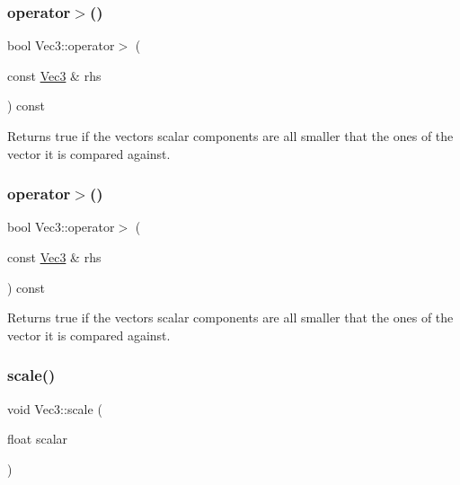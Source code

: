 \subsubsection{\texorpdfstring{operator$>$()}{operator>()}\hspace{0.1cm}{\footnotesize\ttfamily [1/2]}}
{\footnotesize\ttfamily bool Vec3\+::operator$>$ (\begin{DoxyParamCaption}\item[{const \hyperlink{classVec3}{Vec3} \&}]{rhs }\end{DoxyParamCaption}) const\hspace{0.3cm}{\ttfamily [inline]}}

Returns true if the vector\textquotesingle{}s scalar components are all smaller that the ones of the vector it is compared against. \mbox{\label{classVec3_a0dda78fca14e8888aa753ad5a5ae9980}} 
\subsubsection{\texorpdfstring{operator$>$()}{operator>()}\hspace{0.1cm}{\footnotesize\ttfamily [2/2]}}
{\footnotesize\ttfamily bool Vec3\+::operator$>$ (\begin{DoxyParamCaption}\item[{const \hyperlink{classVec3}{Vec3} \&}]{rhs }\end{DoxyParamCaption}) const\hspace{0.3cm}{\ttfamily [inline]}}

Returns true if the vector\textquotesingle{}s scalar components are all smaller that the ones of the vector it is compared against. \mbox{\label{classVec3_a62541bd2e79923b7da500bfabeb54b4a}} 
\subsubsection{\texorpdfstring{scale()}{scale()}\hspace{0.1cm}{\footnotesize\ttfamily [1/2]}}
{\footnotesize\ttfamily void Vec3\+::scale (\begin{DoxyParamCaption}\item[{float}]{scalar }\end{DoxyParamCaption})\hspace{0.3cm}{\ttfamily [inline]}}

